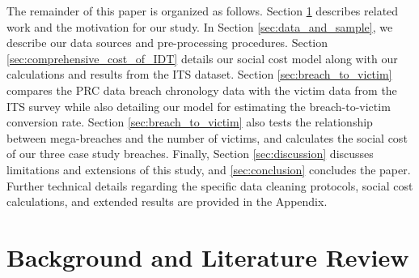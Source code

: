The remainder of this paper is organized as follows. Section \ref{sec:background} describes related work and the motivation for our study. In Section \ref{sec:data_and_sample}, we describe our data sources and pre-processing procedures.  Section \ref{sec:comprehensive_cost_of_IDT} details our social cost model along with our calculations and results from the ITS dataset. Section \ref{sec:breach_to_victim} compares the PRC data breach chronology data with the  victim data from the ITS survey while also detailing our model for estimating the breach-to-victim conversion rate. Section \ref{sec:breach_to_victim} also tests the relationship between mega-breaches and the number of victims, and calculates the social cost of our three case study breaches. Finally, Section \ref{sec:discussion} discusses limitations and extensions of this study, and \ref{sec:conclusion} concludes the paper. Further technical details regarding the specific data cleaning protocols, social cost calculations, and extended results are provided in the Appendix. 





\section{Background and Literature Review}
\label{sec:background}

